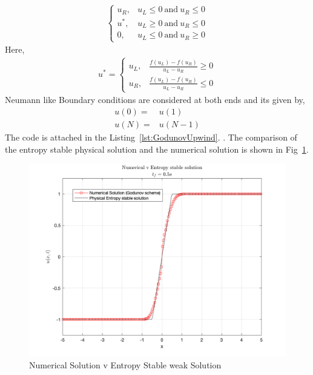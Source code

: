 \documentclass[11pt]{article}
\begin{document}
\begin{enumerate}
\begin{enumerate}
\begin{align*}
\begin{cases}
            u_R, & u_L \leq 0\ \text{and}\ u_R \leq 0 \\
            u^{*}, & u_L \geq 0\ \text{and}\ u_R \leq 0 \\
            0,   & u_L \leq 0\ \text{and}\ u_R \geq 0
        \end{cases}
    \end{align*}
    Here,
    \begin{align*}
        u^{*} =
        \begin{cases}
            u_L, & \frac{f(u_L)-f(u_R)}{u_L-u_R}\geq 0 \\
            u_R, & \frac{f(u_L)-f(u_R)}{u_L-u_R}\leq 0 
        \end{cases}
    \end{align*}
    Neumann like Boundary conditions are considered at both ends and its given by, 
    \begin{align*}
        u(0) =& u(1) \\
        u(N) =& u(N-1) 
    \end{align*}
    The code is attached in the Listing~\ref{lst:GodunovUpwind}.
    . The comparison of the entropy stable physical solution and the numerical solution is shown in Fig~\ref{fig:GUW}.
    \begin{figure}[htp]
        \centering
        \includegraphics[width=5in]{Godunov_FanSol}
        \caption{Numerical Solution v Entropy Stable weak Solution}
        \label{fig:GUW}
    \end{figure}
  \end{enumerate}
  

\end{enumerate}
\end{document}
